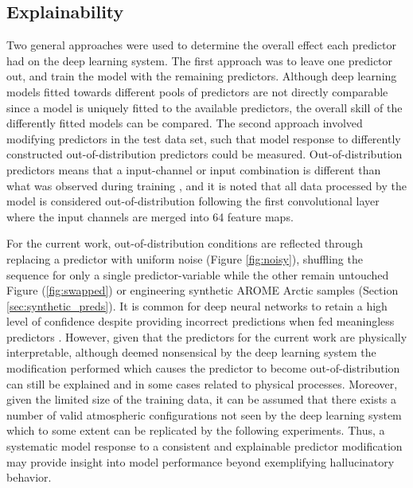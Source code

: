 \documentclass[../main/thesis]{subfiles}
\begin{document}
\subsection{Explainability}
\label{sec:discuss_explain}
Two general approaches were used to determine the overall effect each predictor had on the deep learning system. The first approach was to leave one predictor out, and train the model with the remaining predictors. Although deep learning models fitted towards different pools of predictors are not directly comparable since a model is uniquely fitted to the available predictors, the overall skill of the differently fitted models can be compared. The second approach involved modifying predictors in the test data set, such that model response to differently constructed out-of-distribution predictors could be measured. Out-of-distribution predictors means that a input-channel or input combination is different than what was observed during training \citep{DeVries2018}, and it is noted that all data processed by the model is considered out-of-distribution following the first convolutional layer where the input channels are merged into 64 feature maps. 

For the current work, out-of-distribution conditions are reflected through replacing a predictor with uniform noise (Figure \ref{fig:noisy}), shuffling the sequence for only a single predictor-variable while the other remain untouched Figure (\ref{fig:swapped}) or engineering synthetic AROME Arctic samples (Section \ref{sec:synthetic_preds}). It is common for deep neural networks to retain a high level of confidence despite providing incorrect predictions when fed meaningless predictors \citep{DeVries2018}. However, given that the predictors for the current work are physically interpretable, although deemed nonsensical by the deep learning system the modification performed which causes the predictor to become out-of-distribution can still be explained and in some cases related to physical processes. Moreover, given the limited size of the training data, it can be assumed that there exists a number of valid atmospheric configurations not seen by the deep learning system which to some extent can be replicated by the following experiments. Thus, a systematic model response to a consistent and explainable predictor modification may provide insight into model performance beyond exemplifying hallucinatory behavior.
\end{document}
